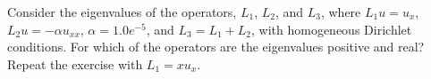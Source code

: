 \begin{exercise}{4.6}
    Consider the eigenvalues of the operators, $L_1$, $L_2$, and $L_3$, where $L_1 u = u_x$, $L_2 u = -\alpha u_{xx}$, $\alpha = 1.0 e^{-5}$, and $L_3 = L_1 + L_2$, with homogeneous Dirichlet conditions.
    For which of the operators are the eigenvalues positive and real?
    Repeat the exercise with $L_1 = x u_x$.
\end{exercise}

\begin{comment}
    \begin{solution}{4.6}
    For this exercise, I'm assuming that the domain is $[0, 1]$.
    For $L_1$, the eigenfunctions are of the from
    \begin{equation}
        u(x) = C e^{\lambda x},
    \end{equation}
    as we then have
    \begin{equation}
        L_1 C e^{\lambda x} = \frac{\partial}{\partial x} C e^{\lambda x} = C \lambda e^{\lambda x}.
    \end{equation}
    For the boundary conditions, we have $u(0) = u(1) = 0$, which gives us
    \begin{equation}
        C e^{\lambda \cdot 0} = C e^0 = C
    \end{equation}
    and
    \begin{equation}
        e^{\lambda \cdot 1} = C e^{\lambda},
    \end{equation}
    which gives us the trivial solution $C = 0$ and $u(x) = 0$, for all $\lambda$.

    For $L_2$, we consider first the operator $\frac{\partial^2}{\partial x^2}$.
    The eigenfunctions of this operator are loosely of the form
    \begin{equation}
        u(x) = e^{i x},
    \end{equation}
    as then
    \begin{equation}
        \frac{\partial^2}{\partial x^2} e^{i x} = -i^2 e^{i x} = -e^{i x}.
    \end{equation}
    In order to get the factor $\alpha$, we need to adjust the exponent such that we have
    \begin{equation}
        u(x) = e^{i \sqrt{\alpha} x}.
    \end{equation}
\end{solution}
\end{comment}

